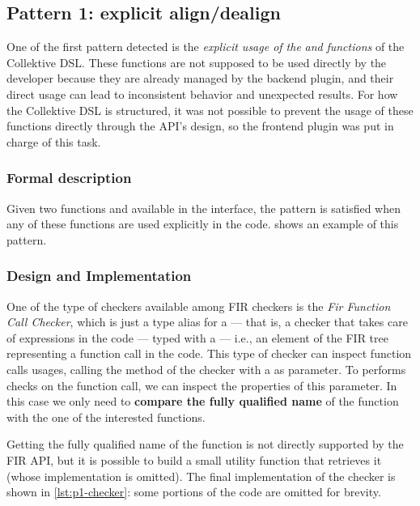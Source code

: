 \documentclass[12pt,a4paper,openright,twoside]{book}
\begin{document}
\subsection{Pattern 1: explicit align/dealign}

One of the first pattern detected is the \emph{explicit usage of the}
 \emph{and}  \emph{functions} of the Collektive
\ac{DSL}. These functions are not supposed to be used directly by the developer
because they are already managed by the backend plugin, and their direct usage
can lead to inconsistent behavior and unexpected results. For how the Collektive
\ac{DSL} is structured, it was not possible to prevent the usage of these
functions directly through the API's design, so the frontend plugin was put in
charge of this task.

\subsubsection{Formal description}

Given two functions  and  available in the
 interface, the pattern is satisfied when any of these
functions are used explicitly in the code.  shows an
example of this pattern.



\subsubsection{Design and Implementation}

One of the type of checkers available among \ac{FIR} checkers is the \emph{Fir
Function Call Checker}, which is just a type alias for a
 --- that is, a checker that takes care of
expressions in the code --- typed with a  --- i.e., an
element of the \ac{FIR} tree representing a function call in the code. This type
of checker can inspect function calls usages, calling the  method of
the checker with a  as parameter. 
%
To performs checks on the function call, we can inspect the properties of this
parameter. In this case we only need to \textbf{compare the fully qualified
name} of the function with the one of the interested functions.

Getting the fully qualified name of the function is not directly supported by
the \ac{FIR} API, but it is possible to build a small utility function that
retrieves it (whose implementation is omitted). The final implementation of the
checker is shown in \cref{lst:p1-checker}: some portions of the code are omitted
for brevity.
\end{document}
